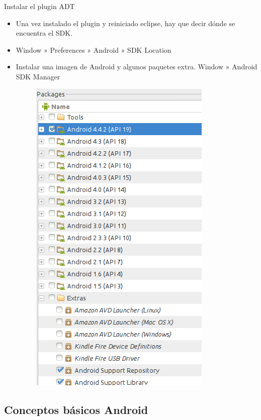 \begin{frame}{Instalar el plugin ADT}{}
  \begin{itemize}
  \item {
    Una vez instalado el plugin y reiniciado eclipse, hay que decir dónde se encuentra el SDK.
  }
  \item {
    Window » Preferences » Android » SDK Location
  }
  \item{
    Instalar una imagen de Android y algunos paquetes extra.
    Window » Android SDK Manager
  }
  \begin{figure}[H]
    \centering
    \includegraphics[scale=.25]{./img/sdkmanager.png}
    \end{figure}
  \end{itemize}
\end{frame}

\subsection{Conceptos básicos Android}

